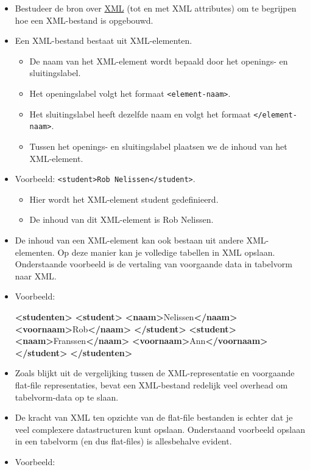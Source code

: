 \documentclass[]{memoir}
\newenvironment{Shaded}{\begin{snugshade}}{\end{snugshade}}
\newcommand{\KeywordTok}[1]{\textcolor[rgb]{0.13,0.29,0.53}{\textbf{#1}}}
\newcommand{\NormalTok}[1]{#1}
\providecommand{\tightlist}{%
  \setlength{\itemsep}{0pt}\setlength{\parskip}{0pt}}
\begin{document}
\begin{itemize}
\item
  Bestudeer de bron over
  \href{https://www.w3schools.com/xml/default.asp}{XML} (tot en met XML
  attributes) om te begrijpen hoe een XML-bestand is opgebouwd.
\item
  Een XML-bestand bestaat uit XML-elementen.

  \begin{itemize}
  \tightlist
  \item
    De naam van het XML-element wordt bepaald door het openings- en
    sluitingslabel.
  \item
    Het openingslabel volgt het formaat
    \texttt{\textless{}element-naam\textgreater{}}.
  \item
    Het sluitingslabel heeft dezelfde naam en volgt het formaat
    \texttt{\textless{}/element-naam\textgreater{}}.
  \item
    Tussen het openings- en sluitingslabel plaatsen we de inhoud van het
    XML-element.
  \end{itemize}
\item
  Voorbeeld:
  \texttt{\textless{}student\textgreater{}Rob\ Nelissen\textless{}/student\textgreater{}}.

  \begin{itemize}
  \tightlist
  \item
    Hier wordt het XML-element student gedefinieerd.
  \item
    De inhoud van dit XML-element is Rob Nelissen.
  \end{itemize}
\item
  De inhoud van een XML-element kan ook bestaan uit andere
  XML-elementen. Op deze manier kan je volledige tabellen in XML
  opslaan. Onderstaande voorbeeld is de vertaling van voorgaande data in
  tabelvorm naar XML.
\item
  Voorbeeld:

\begin{Shaded}
\begin{Highlighting}[]
\KeywordTok{<studenten>}
  \KeywordTok{<student>}
\KeywordTok{<naam>}\NormalTok{Nelissen}\KeywordTok{</naam>}
\KeywordTok{<voornaam>}\NormalTok{Rob}\KeywordTok{</naam>}
  \KeywordTok{</student>}
  \KeywordTok{<student>}
\KeywordTok{<naam>}\NormalTok{Franssen}\KeywordTok{</naam>}
\KeywordTok{<voornaam>}\NormalTok{Ann}\KeywordTok{</voornaam>}
  \KeywordTok{</student>}
\KeywordTok{</studenten>}
\end{Highlighting}
\end{Shaded}
\item
  Zoals blijkt uit de vergelijking tussen de XML-representatie en
  voorgaande flat-file representaties, bevat een XML-bestand redelijk
  veel overhead om tabelvorm-data op te slaan.
\item
  De kracht van XML ten opzichte van de flat-file bestanden is echter
  dat je veel complexere datastructuren kunt opslaan. Onderstaand
  voorbeeld opslaan in een tabelvorm (en dus flat-files) is allesbehalve
  evident.
\item
  Voorbeeld:


\end{itemize}
\end{document}
